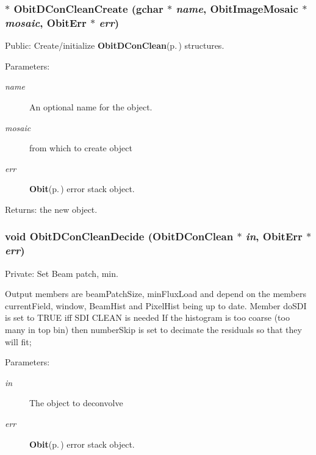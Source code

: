 \subsubsection{$\ast$ Obit\-DCon\-Clean\-Create (gchar $\ast$ {\em name}, {\bf Obit\-Image\-Mosaic} $\ast$ {\em mosaic}, {\bf Obit\-Err} $\ast$ {\em err})}\label{ObitDConClean_8c_a16}


Public: Create/initialize {\bf Obit\-DCon\-Clean}{\rm (p.\,\pageref{structObitDConClean})} structures. 

\begin{Desc}
\item[Parameters:]
\begin{description}
\item[{\em name}]An optional name for the object. \item[{\em mosaic}]from which to create object \item[{\em err}]{\bf Obit}{\rm (p.\,\pageref{structObit})} error stack object. \end{description}
\end{Desc}
\begin{Desc}
\item[Returns:]the new object. \end{Desc}
\subsubsection{\setlength{\rightskip}{0pt plus 5cm}void Obit\-DCon\-Clean\-Decide ({\bf Obit\-DCon\-Clean} $\ast$ {\em in}, {\bf Obit\-Err} $\ast$ {\em err})}\label{ObitDConClean_8c_a5}


Private: Set Beam patch, min. 

Output members are beam\-Patch\-Size, min\-Flux\-Load and depend on the members current\-Field, window, Beam\-Hist and Pixel\-Hist being up to date. Member do\-SDI is set to TRUE iff SDI CLEAN is needed If the histogram is too coarse (too many in top bin) then number\-Skip is set to decimate the residuals so that they will fit; \begin{Desc}
\item[Parameters:]
\begin{description}
\item[{\em in}]The object to deconvolve \item[{\em err}]{\bf Obit}{\rm (p.\,\pageref{structObit})} error stack object. \end{description}
\end{Desc}
